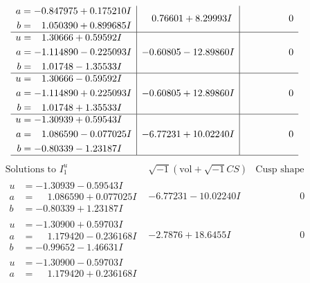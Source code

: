 \documentclass[1p]{elsarticle_modified}
\theoremstyle{definition}
\newcommand{\I}{\sqrt{-1}}
\begin{document}
$$\begin{array}{c|c|c}
\begin{aligned}
a &= -0.847975 + 0.175210 I \\
b &= \phantom{-}1.050390 + 0.899685 I\end{aligned}
 & \phantom{-}0.76601 + 8.29993 I & \phantom{-0.000000 } 0 \\ \hline\begin{aligned}
u &= \phantom{-}1.30666 + 0.59592 I \\
a &= -1.114890 - 0.225093 I \\
b &= \phantom{-}1.01748 - 1.35533 I\end{aligned}
 & -0.60805 - 12.89860 I & \phantom{-0.000000 } 0 \\ \hline\begin{aligned}
u &= \phantom{-}1.30666 - 0.59592 I \\
a &= -1.114890 + 0.225093 I \\
b &= \phantom{-}1.01748 + 1.35533 I\end{aligned}
 & -0.60805 + 12.89860 I & \phantom{-0.000000 } 0 \\ \hline\begin{aligned}
u &= -1.30939 + 0.59543 I \\
a &= \phantom{-}1.086590 - 0.077025 I \\
b &= -0.80339 - 1.23187 I\end{aligned}
 & -6.77231 + 10.02240 I & \phantom{-0.000000 } 0\\
 \hline 
 \end{array}$$\newpage$$\begin{array}{c|c|c}  
\text{Solutions to }I^u_{1}& \I (\text{vol} + \sqrt{-1}CS) & \text{Cusp shape}\\
 \hline 
\begin{aligned}
u &= -1.30939 - 0.59543 I \\
a &= \phantom{-}1.086590 + 0.077025 I \\
b &= -0.80339 + 1.23187 I\end{aligned}
 & -6.77231 - 10.02240 I & \phantom{-0.000000 } 0 \\ \hline\begin{aligned}
u &= -1.30900 + 0.59703 I \\
a &= \phantom{-}1.179420 - 0.236168 I \\
b &= -0.99652 - 1.46631 I\end{aligned}
 & -2.7876 + 18.6455 I & \phantom{-0.000000 } 0 \\ \hline\begin{aligned}
u &= -1.30900 - 0.59703 I \\
a &= \phantom{-}1.179420 + 0.236168 I \\

\end{aligned}
\end{array}$$
\end{document}
